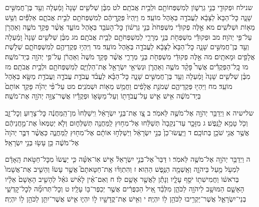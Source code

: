\documentclass[twoside, openany, parskip=half, 11pt]{book}
\begin{document}
שנילח וּפְקוּדֵ֖י בְּנֵ֣י גֵרְשׁ֑וֹן לְמִשְׁפְּחוֹתָ֖ם וּלְבֵ֥ית אֲבֹתָֽם׃ לט מִבֶּ֨ן שְׁלֹשִׁ֤ים שָׁנָה֙ וָמַ֔עְלָה וְעַ֖ד בֶּן־חֲמִשִּׁ֣ים שָׁנָ֑ה כׇּל־הַבָּא֙ לַצָּבָ֔א לַעֲבֹדָ֖ה בְּאֹ֥הֶל מוֹעֵֽד׃ מ וַיִּֽהְיוּ֙ פְּקֻ֣דֵיהֶ֔ם לְמִשְׁפְּחֹתָ֖ם לְבֵ֣ית אֲבֹתָ֑ם אַלְפַּ֕יִם וְשֵׁ֥שׁ מֵא֖וֹת וּשְׁלֹשִֽׁים׃ מא אֵ֣לֶּה פְקוּדֵ֗י מִשְׁפְּחֹת֙ בְּנֵ֣י גֵרְשׁ֔וֹן כׇּל־הָעֹבֵ֖ד בְּאֹ֣הֶל מוֹעֵ֑ד אֲשֶׁ֨ר פָּקַ֥ד מֹשֶׁ֛ה וְאַהֲרֹ֖ן עַל־פִּ֥י יְהֹוָה׃ מב וּפְקוּדֵ֕י מִשְׁפְּחֹ֖ת בְּנֵ֣י מְרָרִ֑י לְמִשְׁפְּחֹתָ֖ם לְבֵ֥ית אֲבֹתָֽם׃ מג מִבֶּ֨ן שְׁלֹשִׁ֤ים שָׁנָה֙ וָמַ֔עְלָה וְעַ֖ד בֶּן־חֲמִשִּׁ֣ים שָׁנָ֑ה כׇּל־הַבָּא֙ לַצָּבָ֔א לַעֲבֹדָ֖ה בְּאֹ֥הֶל מוֹעֵֽד׃ מד וַיִּהְי֥וּ פְקֻדֵיהֶ֖ם לְמִשְׁפְּחֹתָ֑ם שְׁלֹ֥שֶׁת אֲלָפִ֖ים וּמָאתָֽיִם׃ מה אֵ֣לֶּה פְקוּדֵ֔י מִשְׁפְּחֹ֖ת בְּנֵ֣י מְרָרִ֑י אֲשֶׁ֨ר פָּקַ֤ד מֹשֶׁה֙ וְאַהֲרֹ֔ן עַל־פִּ֥י יְהֹוָ֖ה בְּיַד־מֹשֶֽׁה׃ מו כׇּֽל־הַפְּקֻדִ֡ים אֲשֶׁר֩ פָּקַ֨ד מֹשֶׁ֧ה וְאַהֲרֹ֛ן וּנְשִׂיאֵ֥י יִשְׂרָאֵ֖ל אֶת־הַלְוִיִּ֑ם לְמִשְׁפְּחֹתָ֖ם וּלְבֵ֥ית אֲבֹתָֽם׃ מז מִבֶּ֨ן שְׁלֹשִׁ֤ים שָׁנָה֙ וָמַ֔עְלָה וְעַ֖ד בֶּן־חֲמִשִּׁ֣ים שָׁנָ֑ה כׇּל־הַבָּ֗א לַעֲבֹ֨ד עֲבֹדַ֧ת עֲבֹדָ֛ה וַעֲבֹדַ֥ת מַשָּׂ֖א בְּאֹ֥הֶל מוֹעֵֽד׃ מח וַיִּהְי֖וּ פְּקֻדֵיהֶ֑ם שְׁמֹנַ֣ת אֲלָפִ֔ים וַחֲמֵ֥שׁ מֵא֖וֹת וּשְׁמֹנִֽים׃ מט עַל־פִּ֨י יְהֹוָ֜ה פָּקַ֤ד אוֹתָם֙ בְּיַד־מֹשֶׁ֔ה אִ֥ישׁ אִ֛ישׁ עַל־עֲבֹדָת֖וֹ וְעַל־מַשָּׂא֑וֹ וּפְקֻדָ֕יו אֲשֶׁר־צִוָּ֥ה יְהֹוָ֖ה אֶת־מֹשֶֽׁה׃

שלישיה א וַיְדַבֵּ֥ר יְהֹוָ֖ה אֶל־מֹשֶׁ֥ה לֵּאמֹֽר׃ ב צַ֚ו אֶת־בְּנֵ֣י יִשְׂרָאֵ֔ל וִֽישַׁלְּחוּ֙ מִן־הַֽמַּחֲנֶ֔ה כׇּל־צָר֖וּעַ וְכׇל־זָ֑ב וְכֹ֖ל טָמֵ֥א לָנָֽפֶשׁ׃ ג מִזָּכָ֤ר עַד־נְקֵבָה֙ תְּשַׁלֵּ֔חוּ אֶל־מִח֥וּץ לַֽמַּחֲנֶ֖ה תְּשַׁלְּח֑וּם וְלֹ֤א יְטַמְּאוּ֙ אֶת־מַ֣חֲנֵיהֶ֔ם אֲשֶׁ֥ר אֲנִ֖י שֹׁכֵ֥ן בְּתוֹכָֽם׃ ד וַיַּֽעֲשׂוּ־כֵן֙ בְּנֵ֣י יִשְׂרָאֵ֔ל וַיְשַׁלְּח֣וּ אוֹתָ֔ם אֶל־מִח֖וּץ לַֽמַּחֲנֶ֑ה כַּאֲשֶׁ֨ר דִּבֶּ֤ר יְהֹוָה֙ אֶל־מֹשֶׁ֔ה כֵּ֥ן עָשׂ֖וּ בְּנֵ֥י יִשְׂרָאֵֽל׃

ה וַיְדַבֵּ֥ר יְהֹוָ֖ה אֶל־מֹשֶׁ֥ה לֵּאמֹֽר׃ ו דַּבֵּר֮ אֶל־בְּנֵ֣י יִשְׂרָאֵל֒ אִ֣ישׁ אֽוֹ־אִשָּׁ֗ה כִּ֤י יַעֲשׂוּ֙ מִכׇּל־חַטֹּ֣את הָֽאָדָ֔ם לִמְעֹ֥ל מַ֖עַל בַּיהֹוָ֑ה וְאָֽשְׁמָ֖ה הַנֶּ֥פֶשׁ הַהִֽוא׃ ז וְהִתְוַדּ֗וּ אֶֽת־חַטָּאתָם֮ אֲשֶׁ֣ר עָשׂוּ֒ וְהֵשִׁ֤יב אֶת־אֲשָׁמוֹ֙ בְּרֹאשׁ֔וֹ וַחֲמִישִׁת֖וֹ יֹסֵ֣ף עָלָ֑יו וְנָתַ֕ן לַאֲשֶׁ֖ר אָשַׁ֥ם לֽוֹ׃ ח וְאִם־אֵ֨ין לָאִ֜ישׁ גֹּאֵ֗ל לְהָשִׁ֤יב הָאָשָׁם֙ אֵלָ֔יו הָאָשָׁ֛ם הַמּוּשָׁ֥ב לַיהֹוָ֖ה לַכֹּהֵ֑ן מִלְּבַ֗ד אֵ֚יל הַכִּפֻּרִ֔ים אֲשֶׁ֥ר יְכַפֶּר־בּ֖וֹ עָלָֽיו׃ ט וְכׇל־תְּרוּמָ֞ה לְכׇל־קׇדְשֵׁ֧י בְנֵי־יִשְׂרָאֵ֛ל אֲשֶׁר־יַקְרִ֥יבוּ לַכֹּהֵ֖ן ל֥וֹ יִהְיֶֽה׃ י וְאִ֥ישׁ אֶת־קֳדָשָׁ֖יו ל֣וֹ יִהְי֑וּ אִ֛ישׁ אֲשֶׁר־יִתֵּ֥ן לַכֹּהֵ֖ן ל֥וֹ יִהְיֶֽה׃
\end{document}
